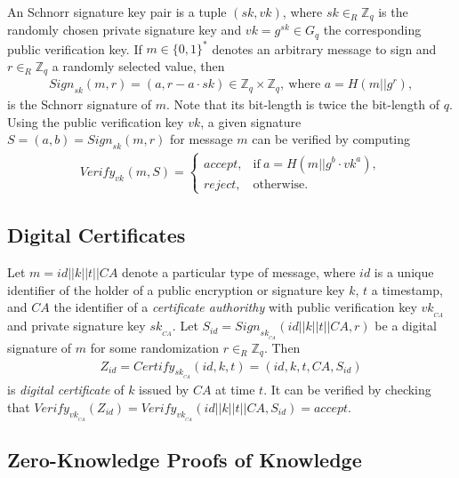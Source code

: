 \documentclass[bibtotoc,halfparskip,oneside]{scrreprt}
\newcommand{\sk}[1]{\mathit{sk}_{#1}\xspace}
\newcommand{\vk}[1]{\mathit{vk}_{#1}\xspace}
\newcommand{\SK}[1]{\sk{_#1}\xspace}
\newcommand{\VK}[1]{\vk{_#1}\xspace}
\newcommand{\CA}{\ensuremath{\mathit{CA}}\xspace}
\begin{document}
An Schnorr signature key pair is a tuple $(sk,vk)$, where $sk\in_R\mathbb{Z}_q$ is the randomly chosen private signature key and $vk=g^{sk}\in G_q$ the corresponding public verification key. If $m\in\{0,1\}^*$ denotes an arbitrary message to sign and $r\in_R\mathbb{Z}_q$ a randomly selected value, then \begin{align}
	\mathit{Sign}_{sk}(m,r)=(a,r-a\cdot sk)\in \mathbb{Z}_q\times \mathbb{Z}_q,~\text{where $a=H(m||g^r)$},
\end{align}
is the Schnorr signature of $m$. Note that its bit-length is twice the bit-length of $q$. Using the public verification key $vk$, a given signature $S=(a,b)=\mathit{Sign}_{sk}(m,r)$ for message $m$ can be verified by computing
\begin{align}
	\mathit{Verify}_{\vk{}}(m,S)=\begin{cases}
	\mathit{accept}, & \text{if}~ a = H(m||g^b\cdot vk^a),\\
	\mathit{reject}, & \text{otherwise}.
	\end{cases}
\end{align}

\subsection{Digital Certificates} 

Let $m=id||k||t||\CA$ denote a particular type of message, where $id$ is a unique identifier of the holder of a public encryption or signature key $k$, $t$ a timestamp, and $\CA$ the identifier of a \emph{certificate authorithy} with public verification key $\VK{\CA}$ and private signature key $\SK{\CA}$. Let $S_{id}=\mathit{Sign}_{\SK{\CA}}(id||k||t||\CA,r)$ be a digital signature of $m$ for some randomization $r\in_R\mathbb{Z}_q$. Then 
\begin{align}
	Z_{id}=\mathit{Certify}_{\SK{\CA}}(id,k,t)=(id,k,t,\CA,S_{id})
\end{align}
is \emph{digital certificate} of $k$ issued by $\CA$ at time $t$. It can be verified by checking that $\mathit{Verify}_{\VK{\CA}}(Z_{id})=\mathit{Verify}_{\VK{\CA}}(id||k||t||\CA,S_{id})=\mathit{accept}$.

\subsection{Zero-Knowledge Proofs of Knowledge}\label{zip}
\end{document}
